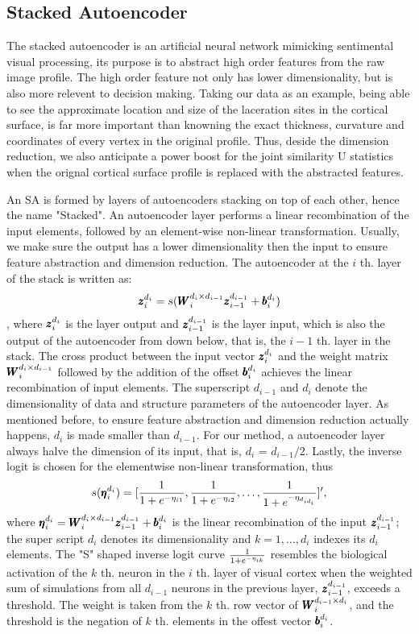 \subsection{Stacked Autoencoder}
The stacked autoencoder is an artificial neural network mimicking sentimental visual processing, its purpose is to abstract high order features from the raw image profile. The high order feature not only has lower dimensionality, but is also more relevent  to decision making. Taking our data as an example, being able to see the approximate location and size of the laceration sites in the cortical surface, is far more important than knowning the exact thickness, curvature and coordinates of every vertex in the original profile. Thus, deside the dimension reduction, we also anticipate a power boost for the joint similarity U statistics when the orignal cortical surface profile is replaced with the abstracted features.

An SA is formed by layers of autoencoders stacking on top of each other, hence the name "Stacked". An autoencoder layer performs a linear recombination of the input elements, followed by an element-wise non-linear transformation. Usually, we make sure the output has a lower dimensionality then the input to ensure feature abstraction and dimension reduction. The autoencoder at the $i$ th. layer of the stack is written as:
\begin{equation} \label{eq:AE}
    \pmb{z}_i^{d_i} = s(\pmb{W}_{i}^{d_{i} \times d_{i-1}} {\pmb{z}_{i-1}^{d_{i-1}}} + \pmb{b}_{i}^{d_{i}}) \\
\end{equation},
where ${\pmb{z}_{i}^{d_{i}}}$ is the layer output and ${\pmb{z}_{i-1}^{d_{i-1}}}$ is the layer input, which is also the output of the autoencoder from down below, that is, the $i-1$ th. layer in the stack. The cross product between the input vector ${\pmb{z}_{i}^{d_{i}}}$ and the weight matrix $\pmb{W}_{i}^{d_{i} \times d_{i-1}}$ followed by the addition of the offset $\pmb{b}_{i}^{d_{i}}$ achieves the linear recombination of input elements. The superscript $d_{i-1}$ and $d_i$ denote the dimensionality of data and structure parameters of the autoencoder layer. As mentioned before, to ensure feature abstraction and dimension reduction actually happens, $d_i$ is made smaller than $d_{i-1}$. For our method, a autoencoder layer always halve the dimension of its input, that is, $d_i$ = $d_{i-1}/2$. Lastly, the inverse logit is chosen for the elementwise non-linear transformation, thus
\begin{equation} \label{eq:InvLgt}
    s(\pmb{\eta}_i^{d_i})     = [\frac{1}{1+e^{-\eta_{i1}}}, \frac{1}{1+e^{-\eta_{i2}}}, \dots, \frac{1}{1+e^{-\eta_{d_{id_i}}}}]^{\prime},
\end{equation}
where $\pmb{\eta}_i^{d_i} = \pmb{W}_{i}^{d_{i} \times d_{i-1}} {\pmb{z}_{i-1}^{d_{i-1}}} + \pmb{b}_{i}^{d_{i}}$ is the linear recombination of the input ${\pmb{z}_{i-1}^{d_{i-1}}}$; the super script $d_i$ denotes its dimensionality and $k = 1, \dots, d_i$ indexes its $d_i$ elements. The "S" shaped inverse logit curve $\frac{1}{1+e^{-\eta_{ik}}}$ resembles the biological activation of the $k$ th. neuron in the $i$ th. layer of visual cortex when the weighted sum of simulations from all $d_{i-1}$ neurons in the previous layer, ${\pmb{z}_{i-1}^{d_{i-1}}}$, exceeds a threshold. The weight is taken from the $k$ th. row vector of $\pmb{W}_{i}^{d_{i-1} \times d_{i}}$,  and the threshold is the negation of $k$ th. elements in the offest vector $\pmb{b}_{i}^{d_{i}}$.

